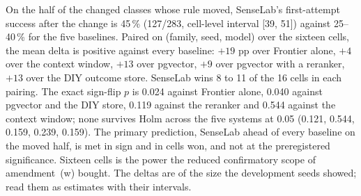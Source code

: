 \documentclass[11pt]{article}
\begin{document}
\begin{table}[H]
\centering\scriptsize\setlength{\tabcolsep}{3pt}
\caption{Confirmatory primary endpoint: SenseLab minus each system on the moved half, percentage points, paired on (family, seed, model); per family $\times$ model means, the mean over the sixteen cells, cells won, the exact two-sided sign-flip $p$ over the cells and its Holm adjustment across the five systems (amendment (x)).}
\label{tab:conf-paired}
\end{table}

On the half of the changed classes whose rule moved, SenseLab's first-attempt success after the
change is 45\,\% (127/283, cell-level interval [39, 51]) against 25--40\,\% for the five
baselines. Paired on (family, seed, model) over the sixteen cells, the mean delta is positive
against every baseline: $+19$ pp over Frontier alone, $+4$ over the context window, $+13$ over
pgvector, $+9$ over pgvector with a reranker, $+13$ over the DIY outcome store. SenseLab wins 8
to 11 of the 16 cells in each pairing. The exact sign-flip $p$ is 0.024 against Frontier alone,
0.040 against pgvector and the DIY store, 0.119 against the reranker and 0.544 against the
context window; none survives Holm across the five systems at 0.05 (0.121, 0.544, 0.159, 0.239,
0.159). The primary prediction, SenseLab ahead of every baseline on the moved half, is met in
sign and in cells won, and not at the preregistered significance. Sixteen cells is the power the
reduced confirmatory scope of amendment~(w) bought. The deltas are of the size the development
seeds showed; read them as estimates with their intervals.
\end{document}
